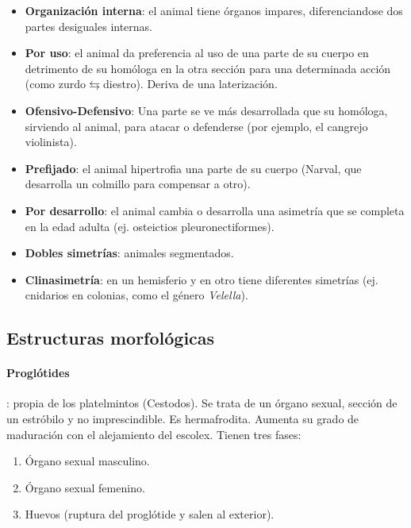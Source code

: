 \begin{itemize}[itemsep=0pt,parsep=0pt,topsep=0pt,partopsep=0pt]
    \begin{itemize}[itemsep=0pt,parsep=0pt,topsep=0pt,partopsep=0pt]
        \item \textbf{Organización interna}: el animal tiene órganos impares, diferenciandose dos partes desiguales internas.
        \item\textbf{Por uso}: el animal da preferencia al uso de una parte de su cuerpo en detrimento de su homóloga en la otra sección para una determinada acción (como zurdo$\leftrightarrows$diestro). Deriva de una laterización.
        \item\textbf{Ofensivo-Defensivo}: Una parte se ve más desarrollada que su homóloga, sirviendo al animal, para atacar o defenderse (por ejemplo, el cangrejo violinista).
        \item\textbf{Prefijado}: el animal hipertrofia una parte de su cuerpo (Narval, que desarrolla un colmillo para compensar a otro).
        \item\textbf{Por desarrollo}: el animal cambia o desarrolla una asimetría que se completa en la edad adulta (ej. osteictios pleuronectiformes).
        \item\textbf{Dobles simetrías}: animales segmentados.
        \item\textbf{Clinasimetría}: en un hemisferio y en otro tiene diferentes simetrías (ej. cnidarios en colonias, como el género \textit{Velella}).
    \end{itemize}
\end{itemize}
\subsection{Estructuras morfológicas}
\paragraph{Proglótides}: propia de los platelmintos (Cestodos). Se trata de un órgano sexual, sección de un estróbilo y no imprescindible. Es hermafrodita. Aumenta su grado de maduración con el alejamiento del escolex. Tienen tres fases:
\begin{enumerate}[itemsep=0pt,parsep=0pt,topsep=0pt,partopsep=0pt]
    \item Órgano sexual masculino.
    \item Órgano sexual femenino.
    \item Huevos (ruptura del proglótide y salen al exterior).
\end{enumerate}
